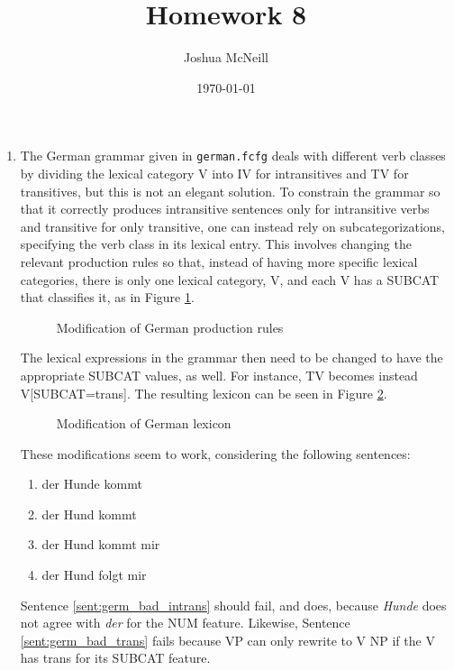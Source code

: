 \documentclass{article}
\title{Homework 8}
\author{Joshua McNeill}
\date{\today}
\newcommand{\lexi}[1]{\textit{#1}}
\begin{document}
  \maketitle
  \begin{enumerate}
    \item The German grammar given in \texttt{german.fcfg} deals with different verb classes by dividing the lexical category V into IV for intransitives and TV for transitives, but this is not an elegant solution.
    To constrain the grammar so that it correctly produces intransitive sentences only for intransitive verbs and transitive for only transitive, one can instead rely on subcategorizations, specifying the verb class in its lexical entry.
    This involves changing the relevant production rules so that, instead of having more specific lexical categories, there is only one lexical category, V, and each V has a SUBCAT that classifies it, as in Figure \ref{fig:germ_productions}.
    \begin{figure}[htbp]
      \caption{Modification of German production rules}
      \label{fig:germ_productions}
      
    \end{figure}
    The lexical expressions in the grammar then need to be changed to have the appropriate SUBCAT values, as well.
    For instance, TV becomes instead V[SUBCAT=trans].
    The resulting lexicon can be seen in Figure \ref{fig:germ_lexicon}.
    \begin{figure}[htbp]
      \caption{Modification of German lexicon}
      \label{fig:germ_lexicon}
      
    \end{figure}
    These modifications seem to work, considering the following sentences:
    \begin{enumerate}
      \item der Hunde kommt\label{sent:germ_bad_intrans}
      \item der Hund kommt\label{sent:germ_good_intrans}
      \item der Hund kommt mir\label{sent:germ_bad_trans}
      \item der Hund folgt mir\label{sent:germ_good_trans}
    \end{enumerate}
    Sentence \ref{sent:germ_bad_intrans} should fail, and does, because \lexi{Hunde} does not agree with \lexi{der} for the NUM feature.
    Likewise, Sentence \ref{sent:germ_bad_trans} fails because VP can only rewrite to V NP if the V has trans for its SUBCAT feature.

\end{enumerate}
\end{document}
